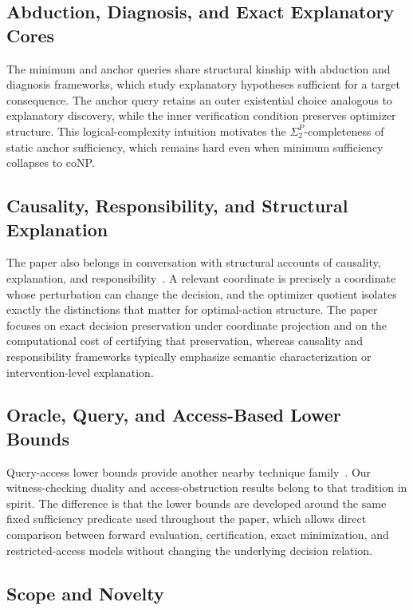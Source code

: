 \subsection{Abduction, Diagnosis, and Exact Explanatory Cores}

The minimum and anchor queries share structural kinship with abduction and diagnosis frameworks, which study explanatory hypotheses sufficient for a target consequence. The anchor query retains an outer existential choice analogous to explanatory discovery, while the inner verification condition preserves optimizer structure. This logical-complexity intuition motivates the $\Sigma_2^P$-completeness of static anchor sufficiency, which remains hard even when minimum sufficiency collapses to coNP.

\subsection{Causality, Responsibility, and Structural Explanation}

The paper also belongs in conversation with structural accounts of causality, explanation, and responsibility~\cite{pearl2009causality,spirtes2000causation,halpern2001explanations,chockler2004responsibility}. A relevant coordinate is precisely a coordinate whose perturbation can change the decision, and the optimizer quotient isolates exactly the distinctions that matter for optimal-action structure. The paper focuses on exact decision preservation under coordinate projection and on the computational cost of certifying that preservation, whereas causality and responsibility frameworks typically emphasize semantic characterization or intervention-level explanation.

\subsection{Oracle, Query, and Access-Based Lower Bounds}

Query-access lower bounds provide another nearby technique family~\cite{dobzinski2012query}. Our witness-checking duality and access-obstruction results belong to that tradition in spirit. The difference is that the lower bounds are developed around the same fixed sufficiency predicate used throughout the paper, which allows direct comparison between forward evaluation, certification, exact minimization, and restricted-access models without changing the underlying decision relation.

\subsection{Scope and Novelty}

